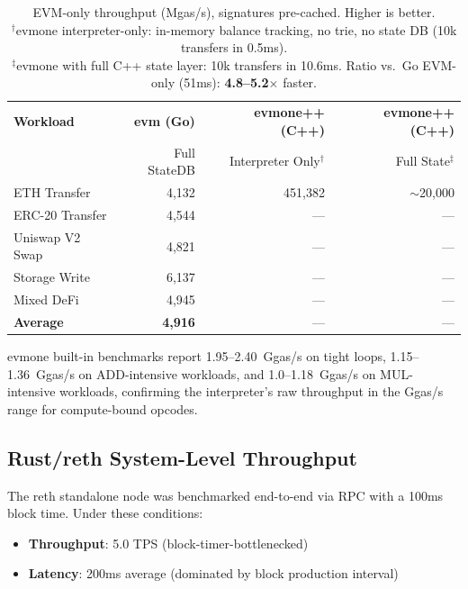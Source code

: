 \documentclass[11pt,twocolumn]{article}
\begin{document}
\begin{table}[h]
\centering
\small
\begin{tabular}{lrrr}
\toprule
\textbf{Workload} & \textbf{evm (Go)} & \textbf{evmone++ (C++)} & \textbf{evmone++ (C++)} \\
                   & Full StateDB       & Interpreter Only$^\dagger$ & Full State$^\ddagger$    \\
\midrule
ETH Transfer       & 4{,}132            & 451{,}382                & $\sim$20{,}000            \\
ERC-20 Transfer    & 4{,}544            & ---                      & ---                       \\
Uniswap V2 Swap    & 4{,}821            & ---                      & ---                       \\
Storage Write       & 6{,}137            & ---                      & ---                       \\
Mixed DeFi          & 4{,}945            & ---                      & ---                       \\
\midrule
\textbf{Average}    & \textbf{4{,}916}   & ---                     & ---                       \\
\bottomrule
\end{tabular}
\caption{EVM-only throughput (Mgas/s), signatures pre-cached. Higher is better.\\
$^\dagger$evmone interpreter-only: in-memory balance tracking, no trie, no state DB
(10k transfers in 0.5ms).\\
$^\ddagger$evmone with full C++ state layer: 10k transfers in 10.6ms.
Ratio vs.\ Go EVM-only (51ms): \textbf{4.8--5.2$\times$} faster.}
\label{tab:sequential}
\end{table}

evmone built-in benchmarks report 1.95--2.40~Ggas/s on tight loops,
1.15--1.36~Ggas/s on ADD-intensive workloads, and 1.0--1.18~Ggas/s on
MUL-intensive workloads, confirming the interpreter's raw throughput
in the Ggas/s range for compute-bound opcodes.

\subsection{Rust/reth System-Level Throughput}

The reth standalone node was benchmarked end-to-end via RPC with a 100ms block
time. Under these conditions:

\begin{itemize}
\item \textbf{Throughput}: 5.0 TPS (block-timer-bottlenecked)
\item \textbf{Latency}: 200ms average (dominated by block production interval)
\end{itemize}
\end{document}
